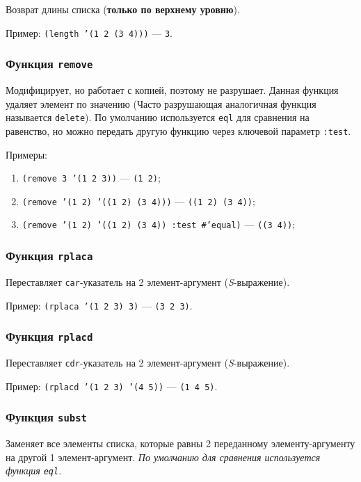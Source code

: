 Возврат длины списка (\textbf{только по верхнему уровню}).

Пример: \texttt{(length '(1 2 (3 4)))} --- \texttt{3}.

\subsubsection{Функция \texttt{remove}}

Модифицирует, но работает с копией, поэтому не разрушает. Данная функция удаляет элемент по значению (Часто разрушающая аналогичная функция называется \texttt{delete}). По умолчанию используется \texttt{eql} для сравнения на равенство, но можно передать другую функцию через ключевой параметр \texttt{:test}.

Примеры: 
\begin{enumerate}
    \item \texttt{(remove 3 '(1 2 3))} --- \texttt{(1 2)};
    \item \texttt{(remove '(1 2) '((1 2) (3 4)))} --- \texttt{((1 2) (3 4))};
    \item \texttt{(remove '(1 2) '((1 2) (3 4)) :test #'equal)} --- \texttt{((3 4))};
\end{enumerate}

\subsubsection{Функция \texttt{rplaca}}

Переставляет \texttt{car}-указатель на 2 элемент-аргумент (\textit{S}-выражение).

Пример: \texttt{(rplaca '(1 2 3) 3)} --- \texttt{(3 2 3)}.

\subsubsection{Функция \texttt{rplacd}}

Переставляет \texttt{cdr}-указатель на 2 элемент-аргумент (\textit{S}-выражение).

Пример: \texttt{(rplacd '(1 2 3) '(4 5))} --- \texttt{(1 4 5)}.

\subsubsection{Функция \texttt{subst}}

Заменяет все элементы списка, которые равны 2 переданному элементу-аргументу на другой 1 элемент-аргумент. \textit{По умолчанию для сравнения используется функция \texttt{eql}}.

